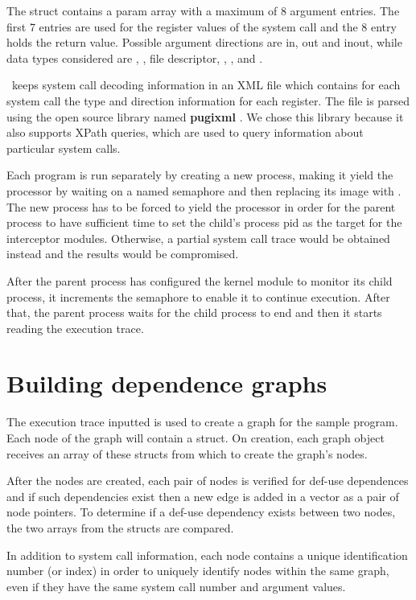 The  struct contains a param array with a maximum of 8 argument entries. The first 7 entries are used for the register values of the system call and the 8 entry holds the return value.
Possible argument directions are  in, out and inout, while data types considered are , , file descriptor, , ,  and .

\project\ keeps system call decoding information in an XML file which contains for each system call the type and direction information for each register. The file is parsed using the open source library named \textbf{pugixml} \cite{pugixml-library}. We chose this library because it also supports XPath queries, which are used to query information about particular system calls.

Each program is run separately by creating a new process, making it yield the processor by waiting on a named semaphore and then replacing its image with . The new process has to be forced to yield the processor in order for the parent process to have sufficient time to set the child’s process pid as the target for the interceptor modules. Otherwise, a partial system call trace would be obtained instead and the results would be compromised. 

After the parent process has configured the kernel module to monitor its child process, it increments the semaphore to enable it to continue execution. After that, the parent process waits for the child process to end and then it starts reading the execution trace.

\section{Building dependence graphs}
\label{fourth:dep-graphs}

The execution trace inputted is used to create a graph for the sample program. Each node of the graph will contain a  struct. On creation, each graph object receives an array of these structs from which to create the graph’s nodes.

After the nodes are created, each pair of nodes is verified for def-use dependences and if such dependencies exist then a new edge is added in a vector as a pair of node pointers. To determine if a def-use dependency exists between two nodes, the two  arrays from the  structs are compared.

In addition to system call information, each node contains a unique identification number (or index) in order to uniquely identify nodes within the same graph, even if they have the same system call number and argument values.

